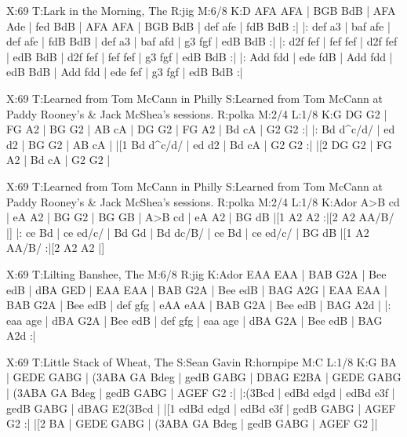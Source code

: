 \documentclass[letterpaper]{article}
\begin{document}
\begin{abc}[name]
X:69
T:Lark in the Morning, The
R:jig
M:6/8
K:D
AFA AFA | BGB BdB | AFA Ade | fed BdB |
AFA AFA | BGB BdB | def afe | fdB BdB :|
|: def a3 | baf afe | def afe | fdB BdB |
def a3 | baf afd | g3 fgf | edB BdB :|
|: d2f fef | fef fef | d2f fef | edB BdB |
d2f fef | fef fef | g3 fgf | edB BdB :|
|: Add fdd | ede fdB | Add fdd | edB BdB |
Add fdd | ede fef | g3 fgf | edB BdB :|
\end{abc}

\begin{abc}[name]
X:69
T:Learned from Tom McCann in Philly
S:Learned from Tom McCann at Paddy Rooney's & Jack McShea's sessions.
R:polka
M:2/4
L:1/8
K:G
DG G2 | FG A2 | BG G2 | AB cA |
DG G2 | FG A2 | Bd cA | G2 G2 :|
|: Bd d^c/d/ | ed d2 | BG G2 | AB cA |
|[1 Bd d^c/d/ | ed d2 | Bd cA | G2 G2 :|
|[2 DG G2 | FG A2 | Bd cA | G2 G2 |
\end{abc}

\begin{abc}[name]
X:69
T:Learned from Tom McCann in Philly
S:Learned from Tom McCann at Paddy Rooney's & Jack McShea's sessions.
R:polka
M:2/4
L:1/8
K:Ador
A>B cd | eA A2 | BG G2 | BG GB |
A>B cd | eA A2 | BG dB |[1 A2 A2 :|[2 A2 AA/B/ |]
|: ce Bd | ce ed/c/ | Bd Gd | Bd dc/B/ |
ce Bd | ce ed/c/ | BG dB |[1 A2 AA/B/ :|[2 A2 A2 |]
\end{abc}

\begin{abc}[name]
X:69
T:Lilting Banshee, The
M:6/8
R:jig
K:Ador
EAA EAA | BAB G2A | Bee edB | dBA GED |
EAA EAA | BAB G2A | Bee edB | BAG A2G |
EAA EAA | BAB G2A | Bee edB | def gfg |
eAA eAA | BAB G2A | Bee edB | BAG A2d |
|: eaa age | dBA G2A | Bee edB | def gfg |
eaa age | dBA G2A | Bee edB | BAG A2d :|
\end{abc}

\begin{abc}[name]
X:69
T:Little Stack of Wheat, The
S:Sean Gavin
R:hornpipe
M:C
L:1/8
K:G
BA | GEDE GABG | (3ABA GA Bdeg | gedB GABG | DBAG E2BA |
GEDE GABG | (3ABA GA Bdeg | gedB GABG | AGEF G2 :|
|:(3Bcd | edBd edgd | edBd e3f | gedB GABG | dBAG E2(3Bcd |
|[1 edBd edgd | edBd e3f | gedB GABG | AGEF G2 :| 
|[2 BA | GEDE GABG | (3ABA GA Bdeg | gedB GABG | AGEF G2 ]|
\end{abc}
\end{document}
